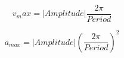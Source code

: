 \documentclass{article}
\begin{document}
\[ v_max = |Amplitude| \frac{2\pi}{Period} \]
\pagebreak

\[ a_{max} = |Amplitude| \left( \frac{2\pi}{Period} \right) ^2 \]
\pagebreak
\end{document}
